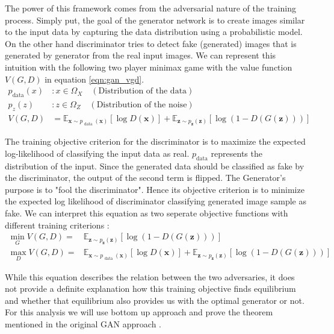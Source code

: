 The power of this framework comes from the adversarial nature of the training process. Simply put,
the goal of the generator network is to create images similar to the input data by capturing the
data distribution using a probabilistic model. On the other hand discriminator tries to detect fake
(generated) images that is generated by generator from the real input images. We can represent this
intuition with the following two player minimax game with the value function $V(G,D)$ in equation \ref{eqn:gan_vgd}.
\cite{Goodfellow:2014:GAN:2969033.2969125}
\begin{align}
    p_{\text{data}} (x) & : x \in \Omega_{X} \quad (\text{Distribution of the data})\\[5pt]
    p_z (z) & : z \in \Omega_{Z} \quad (\text{Distribution of the noise}) \\[5pt]
    \label{eqn:gan_vgd}
    V(G, D) &= \mathbb{E}_{\boldsymbol{x} \sim p_{\text { data }}(\boldsymbol{x})}[\log D(\boldsymbol{x})]+\mathbb{E}_{\boldsymbol{z} \sim p_{\boldsymbol{z}}(\boldsymbol{z})}[\log (1-D(G(\boldsymbol{z})))]
\end{align}

The training objective criterion for the discriminator is to maximize the expected log-likelihood of
classifying the input data as real. $p_{\text{data}}$ represents the distribution of the input.
Since the generated data should be classified as fake by the discriminator, the output of the second
term is flipped. The Generator's purpose is to "fool the discriminator". Hence its objective criterion
is to minimize the expected log likelihood of discriminator classifying generated image sample as
fake. We can interpret this equation as two seperate objective functions with different training
criterions :
\begin{align}
    \min _{G} V(G, D)=& \mathbb{E}_{\boldsymbol{z} \sim p_{\boldsymbol{z}}(\boldsymbol{z})}[\log (1-D(G(\boldsymbol{z})))] \\[5pt]
    \max _{D} V(G, D)=& \mathbb{E}_{\boldsymbol{x} \sim p_{\text { data }}(\boldsymbol{x})}[\log D(\boldsymbol{x})]+\mathbb{E}_{\boldsymbol{z} \sim p_{\boldsymbol{z}}(\boldsymbol{z})}[\log (1-D(G(\boldsymbol{z})))]
\end{align}


While this equation describes the relation between the two adversaries, it does not provide a
definite explanation how this training objective finds equilibrium and whether that equilibrium also
provides us with the optimal generator or not. For this analysis we will use bottom up approach and
prove the theorem mentioned in the original GAN approach \cite{Goodfellow:2014:GAN:2969033.2969125}.

